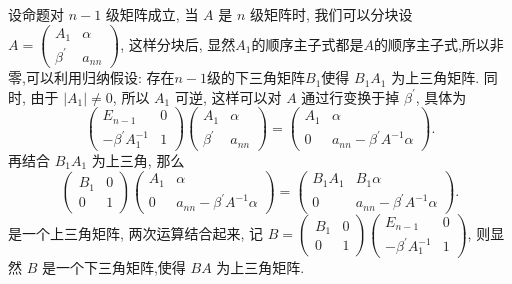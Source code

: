 \documentclass{article}
\begin{document}
设命题对 $n-1$ 级矩阵成立, 当 $A$ 是 $n$ 级矩阵时, 我们可以分块设 $A=\left(\begin{array}{cc}A_{1} & \alpha \\ \beta^{\prime} & a_{n n}\end{array}\right)$, 这样分块后, 显然$A_1$的顺序主子式都是$A$的顺序主子式,所以非零,可以利用归纳假设: 存在$n - 1$级的下三角矩阵$B_1$使得 $B_{1} A_{1}$ 为上三角矩阵. 同时, 由于 $\left|A_{1}\right| \neq 0$, 所以 $A_{1}$ 可逆, 这样可以对 $A$ 通过行变换于掉 $\beta^{\prime}$, 具体为
\begin{equation*}
    \left(\begin{array}{cc}
        E_{n-1}                    & 0 \\
        -\beta^{\prime} A_{1}^{-1} & 1
    \end{array}\right)\left(\begin{array}{cc}
        A_{1}          & \alpha  \\
        \beta^{\prime} & a_{n n}
    \end{array}\right)=\left(\begin{array}{cc}
        A_{1} & \alpha                               \\
        0     & a_{n n}-\beta^{\prime} A^{-1} \alpha
    \end{array}\right).
\end{equation*}
再结合 $B_{1} A_{1}$ 为上三角, 那么
\begin{equation*}
    \left(\begin{array}{cc}
        B_{1} & 0 \\
        0     & 1
    \end{array}\right)\left(\begin{array}{cc}
        A_{1} & \alpha                               \\
        0     & a_{n n}-\beta^{\prime} A^{-1} \alpha
    \end{array}\right)=\left(\begin{array}{cc}
        B_{1} A_{1} & B_{1} \alpha                         \\
        0           & a_{n n}-\beta^{\prime} A^{-1} \alpha
    \end{array}\right).
\end{equation*}
是一个上三角矩阵, 两次运算结合起来, 记 $B=\left(\begin{array}{cc}B_{1} & 0 \\ 0 & 1\end{array}\right)\left(\begin{array}{cc}E_{n-1} & 0 \\ -\beta^{\prime} A_{1}^{-1} & 1\end{array}\right)$, 则显然 $B$ 是一个下三角矩阵,使得 $B A$ 为上三角矩阵.
\end{document}
